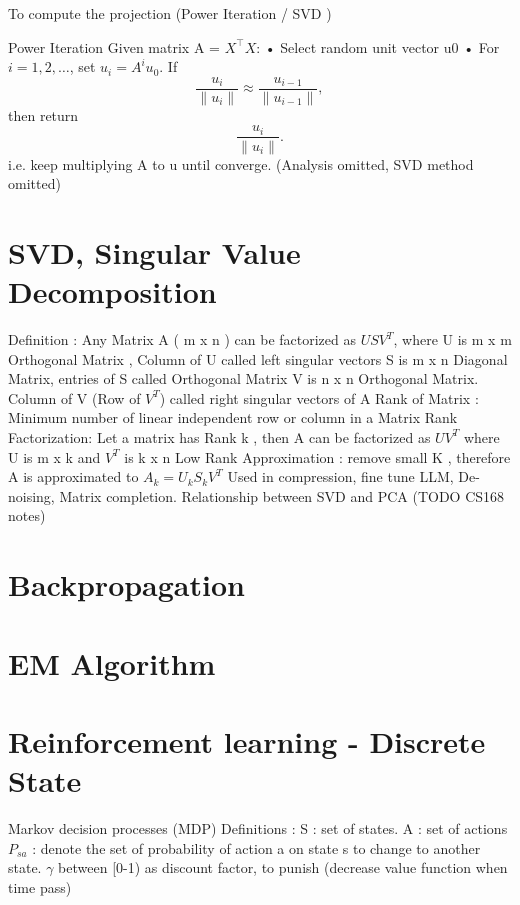 \documentclass{article}
\begin{document}
To compute the projection (Power Iteration / SVD )

 Power Iteration
 Given matrix A =  \(X^\top X\):
 • Select random unit vector u0 \newline
 • For \( i = 1, 2, \dots \), set \( u_i = A^i u_0 \). If 
\[
\frac{u_i}{\|u_i\|} \approx \frac{u_{i-1}}{\|u_{i-1}\|},
\]
then return 
\[
\frac{u_i}{\|u_i\|}.
\]
i.e. keep multiplying  A to u until converge. (Analysis omitted, SVD method omitted)

\section{SVD, Singular Value Decomposition}

Definition : Any Matrix A ( m x n ) can be factorized as \(USV^T\), where \newline
U is m x m Orthogonal Matrix , Column of U called left singular vectors \newline
S is m x n Diagonal Matrix, entries of S called Orthogonal Matrix \newline
V is n x n  Orthogonal Matrix. Column of  V (Row of \(V^T\)) called right singular vectors of A \newline
\newline
\newline
Rank of Matrix : Minimum number of linear independent row or column in a Matrix \newline 
Rank Factorization: Let a matrix has Rank k , then A can be factorized as \(UV^T\) \newline 
where U is m x k and \(V^T\) is k x n \newline 
Low Rank Approximation : remove small K , therefore A is approximated to \(A_k =U_kS_kV^T\) \newline
Used in compression, fine tune LLM, De-noising, Matrix completion. \newline
Relationship between SVD and PCA (TODO CS168 notes) \newline


\section{Backpropagation}
\section{EM Algorithm}
\section{Reinforcement learning - Discrete State}
Markov decision processes (MDP) \newline
Definitions :  \newline
S : set of states. \newline 
A : set of  actions \newline 
\(P_{sa}\) : denote the set of  probability of action a on state s to change to another state. \newline
\(\gamma\) between [0-1) as discount factor, to punish (decrease value function when time pass) \newline
\end{document}

